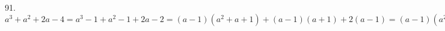 91. $a^3+a^2+2a-4=a^3-1+a^2-1+2a-2=(a-1)(a^2+a+1)+(a-1)(a+1)+2(a-1)=(a-1)(a^2+a+1+a+1+2)=(a-1)(a^2+2a+4).$\\
